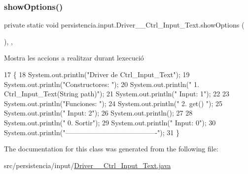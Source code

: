 \subsubsection{\texorpdfstring{show\+Options()}{showOptions()}}
{\footnotesize\ttfamily private static void persistencia.\+input.\+Driver\+\_\+\+\_\+\+Ctrl\+\_\+\+Input\+\_\+\+Text.\+show\+Options (\begin{DoxyParamCaption}{ }\end{DoxyParamCaption})\hspace{0.3cm}{\ttfamily [inline]}, {\ttfamily [static]}, {\ttfamily [private]}}



Mostra les accions a realitzar durant l\textquotesingle{}execució 


\begin{DoxyCode}
17                                      \{
18         System.out.println(\textcolor{stringliteral}{"Driver de Ctrl\_Input\_Text"});
19         System.out.println(\textcolor{stringliteral}{"Constructores: "});
20         System.out.println(\textcolor{stringliteral}{"     1. Ctrl\_Input\_Text(String path)"});
21         System.out.println(\textcolor{stringliteral}{"     Input: 1"});
22 
23         System.out.println(\textcolor{stringliteral}{"Funciones: "});
24         System.out.println(\textcolor{stringliteral}{"     2. get() "});
25         System.out.println(\textcolor{stringliteral}{"     Input: 2"});
26         System.out.println();
27 
28         System.out.println(\textcolor{stringliteral}{"     0. Sortir"});
29         System.out.println(\textcolor{stringliteral}{"     Input: 0"});
30         System.out.println(\textcolor{stringliteral}{"----------------------------------------"});
31     \}
\end{DoxyCode}


The documentation for this class was generated from the following file\+:\begin{DoxyCompactItemize}
\item 
src/persistencia/input/\hyperlink{Driver____Ctrl__Input__Text_8java}{Driver\+\_\+\+\_\+\+Ctrl\+\_\+\+Input\+\_\+\+Text.\+java}\end{DoxyCompactItemize}
